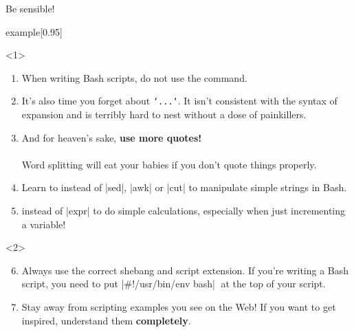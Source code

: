 \begin{frame}{Be sensible!}
    \vspace{-2mm}
    \begin{varblock}{example}[0.95\textwidth]{}
        \large {}
    \end{varblock}
    \medskip
    \parbox[c][0.7\textheight][t]{\textwidth}{
        \begin{onlyenv}<1>
            \begin{enumerate}
                \item When writing Bash scripts, \alert{do not use the \bash{[} command.}\\
                       \bash{[[}
                \item It's also time \alert{you forget about \texttt{`...`}}.
                      It isn't consistent with the syntax of expansion and is terribly hard to nest without a dose of painkillers.
                \item And for heaven's sake, \textbf{use more quotes!}\\
                      \\
                      Word splitting will eat your babies if you don't quote things properly.
                \item Learn to  instead of \bash|sed|, \bash|awk| or \bash|cut| to manipulate simple strings in Bash.
                \item {} instead of \bash|expr| to do simple calculations, especially when just incrementing a variable!
            \end{enumerate}
        \end{onlyenv}
        \begin{onlyenv}<2>
            \begin{enumerate}
                \setcounter{enumi}{5}
                \item Always use the correct shebang and script extension.
                      If you're writing a Bash script, you need to put \bash|\#!/usr/bin/env bash|$\;$ at the top of your script.
                \item Stay away from scripting examples you see on the Web!
                      If you want to get inspired, understand them \textbf{completely}.

\end{enumerate}
\end{onlyenv}}
\end{frame}

